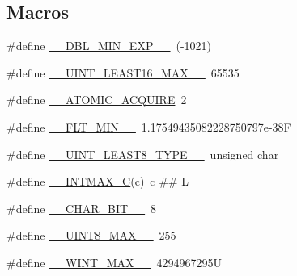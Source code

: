 \subsection*{Macros}
\begin{DoxyCompactItemize}
\item 
\#define \hyperlink{build-analizer__host-_desktop___qt__5__9__0___g_c_c__64bit-_release_2moc__predefs_8h_a63d6f5d1c3371192fe03b3fb06e82400}{\+\_\+\+\_\+\+D\+B\+L\+\_\+\+M\+I\+N\+\_\+\+E\+X\+P\+\_\+\+\_\+}~(-\/1021)
\item 
\#define \hyperlink{build-analizer__host-_desktop___qt__5__9__0___g_c_c__64bit-_release_2moc__predefs_8h_a6a762b969d5eea9e6a8db715a5f5a1a9}{\+\_\+\+\_\+\+U\+I\+N\+T\+\_\+\+L\+E\+A\+S\+T16\+\_\+\+M\+A\+X\+\_\+\+\_\+}~65535
\item 
\#define \hyperlink{build-analizer__host-_desktop___qt__5__9__0___g_c_c__64bit-_release_2moc__predefs_8h_a72e3c30a05bd2bb63d76550e451a438e}{\+\_\+\+\_\+\+A\+T\+O\+M\+I\+C\+\_\+\+A\+C\+Q\+U\+I\+R\+E}~2
\item 
\#define \hyperlink{build-analizer__host-_desktop___qt__5__9__0___g_c_c__64bit-_release_2moc__predefs_8h_a6e947aa0a2cb4808d560339fef0d4793}{\+\_\+\+\_\+\+F\+L\+T\+\_\+\+M\+I\+N\+\_\+\+\_\+}~1.\+17549435082228750797e-\/38\+F
\item 
\#define \hyperlink{build-analizer__host-_desktop___qt__5__9__0___g_c_c__64bit-_release_2moc__predefs_8h_a5a8c0a31337df765b55c6260ef58e51e}{\+\_\+\+\_\+\+U\+I\+N\+T\+\_\+\+L\+E\+A\+S\+T8\+\_\+\+T\+Y\+P\+E\+\_\+\+\_\+}~unsigned char
\item 
\#define \hyperlink{build-analizer__host-_desktop___qt__5__9__0___g_c_c__64bit-_release_2moc__predefs_8h_adb0d09cff489746c5456407aa832fced}{\+\_\+\+\_\+\+I\+N\+T\+M\+A\+X\+\_\+\+C}(c)~c \#\# L
\item 
\#define \hyperlink{build-analizer__host-_desktop___qt__5__9__0___g_c_c__64bit-_release_2moc__predefs_8h_ab35e271dce6e7e2190d60b5905375419}{\+\_\+\+\_\+\+C\+H\+A\+R\+\_\+\+B\+I\+T\+\_\+\+\_\+}~8
\item 
\#define \hyperlink{build-analizer__host-_desktop___qt__5__9__0___g_c_c__64bit-_release_2moc__predefs_8h_afd12ac7489bdbbed7fa3cc51023b8f73}{\+\_\+\+\_\+\+U\+I\+N\+T8\+\_\+\+M\+A\+X\+\_\+\+\_\+}~255
\item 
\#define \hyperlink{build-analizer__host-_desktop___qt__5__9__0___g_c_c__64bit-_release_2moc__predefs_8h_a8925e15bce319fa2f42c659f6a3e0199}{\+\_\+\+\_\+\+W\+I\+N\+T\+\_\+\+M\+A\+X\+\_\+\+\_\+}~4294967295\+U
\item 

\end{DoxyCompactItemize}
